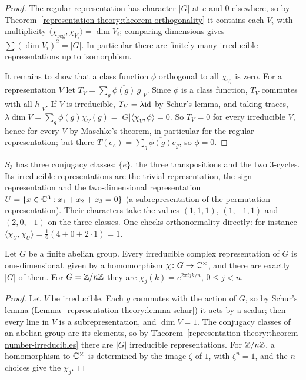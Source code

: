 \begin{proof}
The regular representation has character $|G|$ at $e$ and $0$ elsewhere, so by
Theorem~\ref{representation-theory:theorem-orthogonality} it contains each $V_i$ with multiplicity
$\langle \chi_{\mathrm{reg}}, \chi_{V_i}\rangle = \dim V_i$; comparing dimensions gives $\sum(\dim V_i)^2 = |G|$. In particular there
are finitely many irreducible representations up to isomorphism.

It remains to show that a class function $\phi$ orthogonal to all $\chi_{V_i}$ is zero. For a representation $V$ let
$T_V = \sum_g \overline{\phi(g)}\, g|_V$. Since $\phi$ is a class function, $T_V$ commutes with all $h|_V$. If $V$ is
irreducible, $T_V = \lambda \mathrm{id}$ by Schur's lemma, and taking traces,
$\lambda \dim V = \sum_g \overline{\phi(g)}\chi_V(g) = |G|\langle \chi_V, \phi \rangle = 0$. So $T_V = 0$ for every irreducible $V$, hence
for every $V$ by Maschke's theorem, in particular for the regular representation; but there
$T(e_e) = \sum_g \overline{\phi(g)} e_g$, so $\phi = 0$.
\end{proof}

\begin{example}\label{representation-theory:example-s3}
$S_3$ has three conjugacy classes: $\{e\}$, the three transpositions and the two $3$-cycles. Its irreducible
representations are the trivial representation, the sign representation and the two-dimensional
representation $U = \{x \in \mathbb{C}^3 : x_1 + x_2 + x_3 = 0\}$ (a subrepresentation of the permutation representation).
Their characters take the values $(1, 1, 1)$, $(1, -1, 1)$ and $(2, 0, -1)$ on the three classes. One checks
orthonormality directly: for instance $\langle \chi_U, \chi_U\rangle = \frac16(4 + 0 + 2 \cdot 1) = 1$.
\end{example}

\begin{proposition}\label{representation-theory:proposition-abelian}
Let $G$ be a finite abelian group. Every irreducible complex representation of $G$ is one-dimensional, given by a homomorphism $\chi \colon G \to \mathbb{C}^\times$, and there are exactly $|G|$ of them. For $G = \mathbb{Z}/n\mathbb{Z}$ they are
$\chi_j(k) = e^{2\pi ijk/n}$, $0 \leq j < n$.
\end{proposition}

\begin{proof}
Let $V$ be irreducible. Each $g$ commutes with the action of $G$, so by Schur's lemma (Lemma~\ref{representation-theory:lemma-schur}) it acts by a scalar; then every line in $V$ is a subrepresentation, and $\dim V = 1$. The conjugacy
classes of an abelian group are its elements, so by Theorem~\ref{representation-theory:theorem-number-irreducibles} there are $|G|$ irreducible representations. For $\mathbb{Z}/n\mathbb{Z}$, a homomorphism to $\mathbb{C}^\times$ is determined by the image
$\zeta$ of $1$, with $\zeta^n = 1$, and the $n$ choices give the $\chi_j$.
\end{proof}

